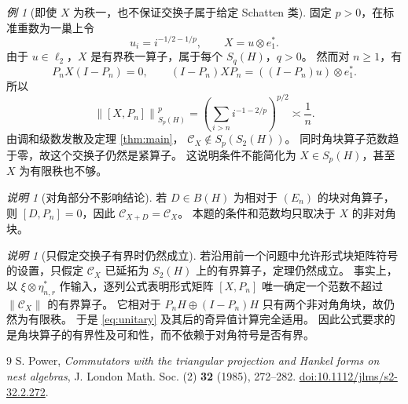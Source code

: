 \documentclass[UTF8,11pt,a4paper,fontset=fandol]{ctexart}
\theoremstyle{remark}
\newtheorem{remark}[theorem]{说明}
\newtheorem{example}[theorem]{例}
\newcommand{\CC}{\mathcal C}
\newcommand{\norm}[1]{\left\lVert #1\right\rVert}
\begin{document}
\begin{example}[即使 $X$ 为秩一，也不保证交换子属于给定 Schatten 类]
固定 $p>0$，在标准重数为一巢上令
\[
 u_i=i^{-1/2-1/p},\qquad
 X=u\otimes e_1^*.
\]
由于 $u\in\ell_2$，$X$ 是有界秩一算子，属于每个 $S_q(H)$，$q>0$。
然而对 $n\geq1$，有
\[
 P_nX(I-P_n)=0,\qquad
 (I-P_n)XP_n=((I-P_n)u)\otimes e_1^*.
\]
所以
\[
 \norm{[X,P_n]}_{S_p(H)}^p
 =\left(\sum_{i>n}i^{-1-2/p}\right)^{p/2}
 \asymp\frac1n.
\]
由调和级数发散及定理 \ref{thm:main}，
$\CC_X\notin S_p(S_2(H))$。
同时角块算子范数趋于零，故这个交换子仍然是紧算子。
这说明条件不能简化为 $X\in S_p(H)$，甚至 $X$ 为有限秩也不够。
\end{example}

\begin{remark}[对角部分不影响结论]
若 $D\in B(H)$ 为相对于 $(E_n)$ 的块对角算子，则
$[D,P_n]=0$，因此 $\CC_{X+D}=\CC_X$。
本题的条件和范数均只取决于 $X$ 的非对角块。
\end{remark}

\begin{remark}[只假定交换子有界时仍然成立]
若沿用前一个问题中允许形式块矩阵符号的设置，只假定
$\CC_X$ 已延拓为 $S_2(H)$ 上的有界算子，定理仍然成立。
事实上，以 $\xi\otimes\eta_{n,r}^*$ 作输入，逐列公式表明形式矩阵
$[X,P_n]$ 唯一确定一个范数不超过 $\norm{\CC_X}$ 的有界算子。
它相对于 $P_nH\oplus(I-P_n)H$ 只有两个非对角角块，故仍然为有限秩。
于是 \eqref{eq:unitary} 及其后的奇异值计算完全适用。
因此公式要求的是角块算子的有界性及可和性，而不依赖于对角符号是否有界。
\end{remark}

\begin{thebibliography}{9}
S. Power,
\emph{Commutators with the triangular projection and Hankel forms on nest algebras},
J. London Math. Soc. (2) \textbf{32} (1985), 272--282.
\href{https://doi.org/10.1112/jlms/s2-32.2.272}{doi:10.1112/jlms/s2-32.2.272}.
\end{thebibliography}
\end{document}
